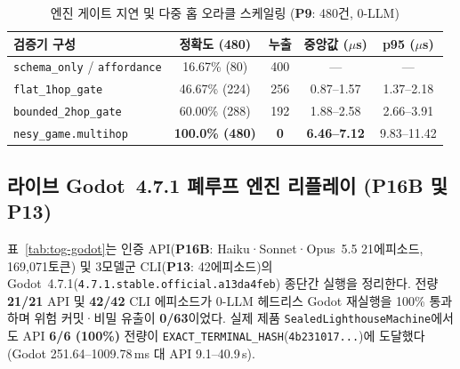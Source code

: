 \begin{table}[!tbp]
\caption{엔진 게이트 지연 및 다중 홉 오라클 스케일링 (\textbf{P9}: 480건, 0-LLM)}
\label{tab:tog-datalog}
\centering
\scriptsize
\setlength{\tabcolsep}{3pt}
\begin{tabularx}{\columnwidth}{@{}lcccc@{}}
\toprule
\textbf{검증기 구성} & \textbf{정확도 (480)} & \textbf{누출} & \textbf{중앙값 ($\mu$s)} & \textbf{p95 ($\mu$s)} \\
\midrule
\texttt{schema\_only} / \texttt{affordance} & 16.67\% (80) & 400 & --- & --- \\
\texttt{flat\_1hop\_gate} & 46.67\% (224) & 256 & 0.87--1.57 & 1.37--2.18 \\
\texttt{bounded\_2hop\_gate} & 60.00\% (288) & 192 & 1.88--2.58 & 2.66--3.91 \\
\texttt{nesy\_game.multihop} & \textbf{100.0\% (480)} & \textbf{0} & \textbf{6.46--7.12} & 9.83--11.42 \\
\bottomrule
\end{tabularx}
\end{table}

\subsection{라이브 Godot~4.7.1 폐루프 엔진 리플레이 (\textbf{P16B} 및 \textbf{P13})}\label{sec:tog-godot}
표~\ref{tab:tog-godot}는 인증 API(\textbf{P16B}: Haiku·Sonnet·Opus~5.5 21에피소드, 169,071토큰) 및 3모델군 CLI(\textbf{P13}: 42에피소드)의 Godot~4.7.1(\texttt{4.7.1.\allowbreak stable.\allowbreak official.\allowbreak a13da4feb}) 종단간 실행을 정리한다. 전량 \textbf{21/21} API 및 \textbf{42/42} CLI 에피소드가 0-LLM 헤드리스 Godot 재실행을 100\% 통과하며 위험 커밋·비밀 유출이 \textbf{0/63}이었다. 실제 제품 \texttt{SealedLighthouseMachine}에서도 API \textbf{6/6 (100\%)} 전량이 \texttt{EXACT\_\allowbreak TERMINAL\_\allowbreak HASH}(\texttt{4b231017...})에 도달했다(Godot 251.64--1009.78\,ms 대 API 9.1--40.9\,s).


